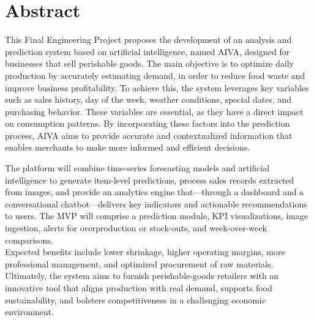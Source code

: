 \chapter*{Abstract}

    This Final Engineering Project proposes the development of an analysis and prediction system based on artificial intelligence, named AIVA, designed for businesses that sell perishable goods. The main objective is to optimize daily production by accurately estimating demand, in order to reduce food waste and improve business profitability. To achieve this, the system leverages key variables such as sales history, day of the week, weather conditions, special dates, and purchasing behavior. These variables are essential, as they have a direct impact on consumption patterns. By incorporating these factors into the prediction process, AIVA aims to provide accurate and contextualized information that enables merchants to make more informed and efficient decisions.
    
    The platform will combine time-series forecasting models and artificial intelligence to generate item-level predictions, process sales records extracted from images, and provide an analytics engine that—through a dashboard and a conversational chatbot—delivers key indicators and actionable recommendations to users. The MVP will comprise a prediction module, KPI visualizations, image ingestion, alerts for overproduction or stock-outs, and week-over-week comparisons.\\
    
    Expected benefits include lower shrinkage, higher operating margins, more professional management, and optimized procurement of raw materials. Ultimately, the system aims to furnish perishable-goods retailers with an innovative tool that aligns production with real demand, supports food sustainability, and bolsters competitiveness in a challenging economic environment.
